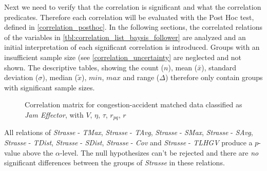 Next we need to verify that the correlation is significant and what the correlation predicates. Therefore each correlation will be evaluated with the Post Hoc test, defined in \cref{correlation_posthoc}. In the following sections, the correlated relations of the variables in \cref{tbl:correlation_list_baysis_follower} are analyzed and an initial interpretation of each significant correlation is introduced. Groups with an insufficient sample size (see \cref{correlation_uncertainty} are neglected and not shown. The descriptive tables, showing the count ($n$), mean ($\bar{x}$), standard deviation ($\sigma$), median ($\tilde{x}$), $min$, $max$ and range ($\Delta$) therefore only contain groups with significant sample sizes.

\begin{figure}[!ht]
	\centering
	\caption{Correlation matrix for congestion-accident matched data classified as \textit{Jam Effector}, with $V$, $\eta$, $\tau$, $r_{pq}$, $r$}
	\label{img:correlation_matrix_selected_effector_cramers}
\end{figure}

All relations of \textit{Strasse} - \textit{TMax}, \textit{Strasse} - \textit{TAvg}, \textit{Strasse} - \textit{SMax}, \textit{Strasse} - \textit{SAvg}, \textit{Strasse} - \textit{TDist}, \textit{Strasse} - \textit{SDist}, \textit{Strasse} - \textit{Cov} and \textit{Strasse} - \textit{TLHGV} produce a $p$-value above the $\alpha$-level. The null hypothesizes can't be rejected and there are \textit{no} significant differences between the groups of \textit{Strasse} in these relations.

